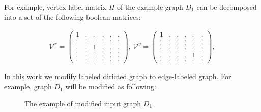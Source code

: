 For example, vertex label matrix $H$ of the example graph $D_1$ can be decomposed into a set of the following boolean matrices:

\begin{align*}
\mathcal{V}^x =
\begin{pmatrix}
    1 & . & . & . & . & .   \\
    . & . & . & . & . & . \\
    . & . & 1 & . & . & .\\
    . & . & . & . & . & . \\ 
    . & . & . & . & . & . \\ 
    . & . & . & . & . & .
\end{pmatrix},~ 
\mathcal{V}^y =
\begin{pmatrix}
    1 & . & . & . & . & .   \\
    . & . & . & . & . & . \\
    . & . & . & . & . & .\\
    . & . & . & . & . & . \\ 
    . & . & . & . & 1 & . \\ 
    . & . & . & . & . & .
\end{pmatrix},  \label{eq:boolean_decomposition_of_graph}
\end{align*}

In this work we modify labeled diricted graph to edge-labeled graph. For example, graph $D_1$ will be modified as following: 
\begin{figure}[h]
    \centering        
    \caption{The example of modified input graph $D_1$}
    \label{fig:example_modified_input_graph}
\end{figure}


